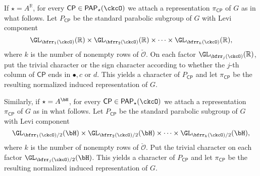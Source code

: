 \documentclass[12pt]{amsart}
\def\Im{\operatorname{Im}}
\newcommand{\CO}{{\mathcal {O}}}
\newcommand{\CP}{{\mathcal {P}}}
\newcommand{\R}{\mathbb R}
\numberwithin{equation}{section}
\theoremstyle{remark}
\def\CP{\mathsf{CP}}
\def\PP{\mathsf{PAP}}
\def\Im{\mathrm{Im}}
\begin{document}


If $\star=A^\R$, for every
$\CP\in \PP_{\star}(\ckcO)$ we attach a representation $\pi_\CP$ of $G$ as in what follows. Let $P_\CP$ be  the standard parabolic subgroup of $G$
with Levi component
$$
\GL_{\bfrr_1(\ckcO)}(\R)\times \GL_{\bfrr_2(\ckcO)}(\R)\times\dots \times \GL_{\bfrr_k(\ckcO)}(\R),
$$
where $k$ is the number of nonempty rows of $\check \CO$.
On each factor $\GL_{\bfrr_j(\ckcO)}(\R)$, put the trivial character or the sign character  according to whether the $j$-th column
of $\CP$ ends in $\bullet,c$ or $d$. This yields a character of $P_\CP$ and let  $\pi_\CP$ be the resulting normalized induced representation of $G$.


Similarly, if  $\star=A^\bH$, for every
$\CP\in \PP_{\star}(\ckcO)$ we attach a representation $\pi_\CP$ of $G$ as in  what follows. Let $P_\CP$ be  the standard parabolic subgroup of $G$
with Levi component
$$
\GL_{\bfrr_1(\ckcO)/2}(\bH)\times \GL_{\bfrr_2(\ckcO)/2}(\bH)\times\dots \times \GL_{\bfrr_k(\ckcO)/2}(\bH),
$$
where $k$ is the number of nonempty rows of $\check \CO$.
Put the trivial character on each factor $\GL_{\bfrr_j(\ckcO)/2}(\bH)$. This yields a character of $P_\CP$ and let  $\pi_\CP$ be the resulting normalized induced representation of $G$.
\end{document}
